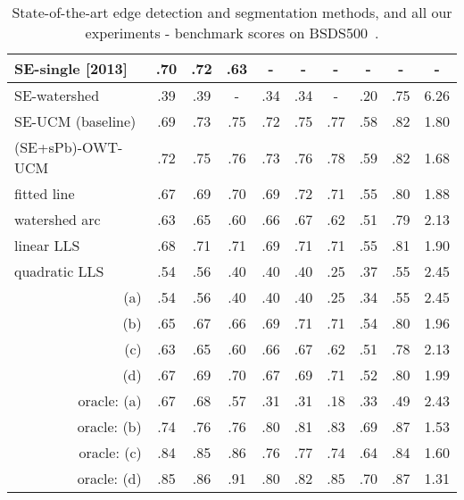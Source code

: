 \begin{table}[htbp]
\begin{tabular}{l|c|c|c||c|c|c||c|c|c|}
\hline
\hline
\multicolumn{1}{|l|}{\cite{DollarICCV13edges} SE-single [2013]} & .70 & .72 & .63 & - & - & - & - & - & - \\
\hline
\multicolumn{1}{|l|}{SE-watershed} & .39 & .39 & - & .34 & .34 & - & .20 & .75 & 6.26 \\
\hline
\multicolumn{1}{|l|}{SE-UCM (baseline)} & .69 &.73 & .75 & .72 & .75 & .77 & .58 & .82 & 1.80 \\
\hline
\multicolumn{1}{|l|}{(SE+sPb)-OWT-UCM} & .72 & .75 & .76 & .73 & .76 & .78 & .59 & .82 & 1.68 \\ %
\hline
\hline
\multicolumn{1}{|l|}{fitted line} &  .67 & .69 & .70 & .69 & .72 & .71 & .55 & .80 & 1.88 \\ %
\hline
\multicolumn{1}{|l|}{watershed arc} & .63 & .65 & .60 & .66 & .67 & .62 & .51 & .79 & 2.13 \\ %
\hline
\hline
\multicolumn{1}{|l|}{linear LLS} & .68 & .71 & .71 & .69 & .71 & .71 & .55 & .81 & 1.90 \\%
\hline
\multicolumn{1}{|l|}{quadratic LLS} & .54 & .56 & .40 & .40 & .40 & .25 & .37 & .55 & 2.45 \\
\hline
\hline
\multicolumn{1}{|r|}{(a)} & .54 & .56 & .40 & .40 & .40 & .25 & .34 & .55 & 2.45 \\
\multicolumn{1}{|r|}{(b)} & .65 & .67 & .66 & .69 & .71 & .71 & .54 & .80 & 1.96 \\
\multicolumn{1}{|r|}{(c)} & .63 & .65 & .60 & .66 & .67 & .62 & .51 & .78 & 2.13 \\
\multicolumn{1}{|r|}{(d)} & .67 & .69 & .70 & .67 & .69 & .71 & .52 & .80 & 1.99 \\
\multicolumn{1}{|r|}{oracle: (a)} & .67 & .68 & .57 & .31 & .31 & .18 & .33 & .49 & 2.43 \\
\multicolumn{1}{|r|}{oracle: (b)} & .74 & .76 & .76 & .80 & .81 & .83 & .69 & .87 & 1.53 \\
\multicolumn{1}{|r|}{oracle: (c)} & .84 & .85 & .86 & .76 & .77 & .74 & .64 & .84 & 1.60 \\
\multicolumn{1}{|r|}{oracle: (d)} & .85 & .86 & .91 & .80 & .82 & .85 & .70 & .87 & 1.31 \\
\hline
\end{tabular}
\caption[Benchmark scores for SoA and ours]{State-of-the-art edge detection and segmentation methods, and all our experiments - benchmark scores on BSDS500~\cite{BSDS500resources}.}
\label{tab:all-results}
\end{table}

